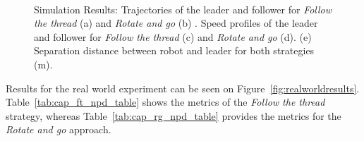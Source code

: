 \documentclass[journal]{IEEEtran}
\begin{document}
\begin{figure}
    \\
    \vspace*{-2.5em}
  \caption{Simulation Results: Trajectories of the leader and follower for \textit{Follow the thread} (a) and \textit{Rotate and go} (b) . 
        Speed profiles of the leader and follower for \textit{Follow the thread} (c) and \textit{Rotate and go} (d). 
        (e) Separation distance between robot and leader for both strategies  (m).}
  \label{fig:simulationresults} 
\end{figure}



Results for the real world experiment can be seen on Figure~\ref{fig:realworldresults}.   Table~\ref{tab:cap_ft_npd_table} shows the metrics of the \textit{Follow the thread} strategy, whereas Table~\ref{tab:cap_rg_npd_table} provides the metrics for the \textit{Rotate and go} approach.

%
%
%
%
%
%
%
%
\end{document}
